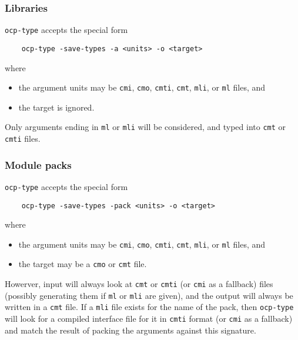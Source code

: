 \subsubsection*{Libraries}

\verb!ocp-type! accepts the special form
{\verbsize\begin{verbatim}
    ocp-type -save-types -a <units> -o <target>
\end{verbatim}}
where
\begin{itemize}
\item the argument units may be \verb!cmi!, \verb!cmo!,  \verb!cmti!, \verb!cmt!, \verb!mli!, or  \verb!ml! files, and
\item the target is ignored.
\end{itemize}
Only arguments ending in \verb!ml! or \verb!mli! will be considered,
and typed into \verb!cmt! or \verb!cmti! files.

\subsubsection*{Module packs}

\verb!ocp-type! accepts the special form
{\verbsize\begin{verbatim}
    ocp-type -save-types -pack <units> -o <target>
\end{verbatim}}
where
\begin{itemize}
\item the argument units may be \verb!cmi!, \verb!cmo!,  \verb!cmti!, \verb!cmt!, \verb!mli!, or  \verb!ml! files, and
\item the target may be a \verb!cmo! or \verb!cmt! file.
\end{itemize}
Howerver, input will always look at \verb!cmt! or \verb!cmti! (or
\verb!cmi! as a fallback) files (possibly generating them if \verb!ml!
or \verb!mli!  are given), and the output will always be written in a
\verb!cmt! file.  If a \verb!mli! file exists for the name of the
pack, then \verb!ocp-type! will look for a compiled interface file for
it in \verb!cmti! format (or \verb!cmi! as a fallback) and match the
result of packing the arguments against this signature.
